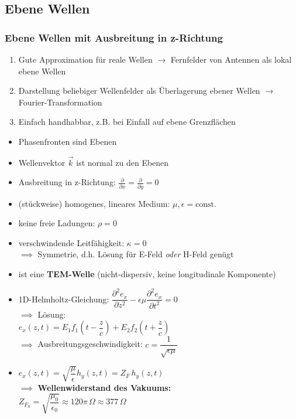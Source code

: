 	 \subsection{Ebene Wellen}
	 {\small%
	 \subsubsection{Ebene Wellen mit Ausbreitung in z-Richtung}
	 \begin{enumerate}
	 	\itemsep0pt
		\item Gute Approximation für reale Wellen \(\to\) Fernfelder von Antennen als lokal ebene Wellen
		\item Darstellung beliebiger Wellenfelder als Überlagerung ebener Wellen \(\to\) Fourier-Transformation
		\item Einfach handhabbar, z.B. bei Einfall auf ebene Grenzflächen
	 \end{enumerate}
	 \begin{itemize}
	 	\itemsep0pt
		\item Phasenfronten sind Ebenen
		\item Wellenvektor \(\vec{k}\) ist normal zu den Ebenen
		\item Ausbreitung in z-Richtung: \(\frac{\partial}{\partial x} = \frac{\partial}{\partial y} = 0\)
		\item (stückweise) homogenes, lineares Medium: \(\mu, \epsilon = \mathrm{const.}\)
		\item keine freie Ladungen: \(\rho = 0\)
		\item verschwindende Leitfähigkeit: \(\kappa = 0\)\\
		\(\implies\) Symmetrie, d.h. Lösung für E-Feld \textit{oder} H-Feld genügt
		\item ist eine \textbf{TEM-Welle} (nicht-dispersiv, keine longitudinale Komponente)
		\item 1D-Helmholtz-Gleichung: \(\dfrac{\partial^2e_x}{\partial z^2} - \epsilon\mu \dfrac{\partial^2 e_x}{\partial t^2} = 0\)\\
		\(\implies\) Lösung:\\
		\(e_x(z,t) = E_1 f_1\left(t - \dfrac{z}{c}\right) + E_2 f_2\left(t + \dfrac{z}{c}\right)\)\\
		\(\implies\) Ausbreitungsgeschwindigkeit: \(c = \dfrac{1}{\sqrt{\epsilon\mu}}\)
		\item \(e_x(z,t) = \sqrt{\dfrac{\mu}{\epsilon}} h_y(z,t) = Z_F\, h_y(z,t) \)\\
		\(\implies\) \textbf{Wellenwiderstand des Vakuums:}\\
		\(Z_{F_0} = \sqrt{\dfrac{\mu_0}{\epsilon_0}} \approx 120\pi\,\Omega \approx 377\,\Omega\)
	 \end{itemize}
}
